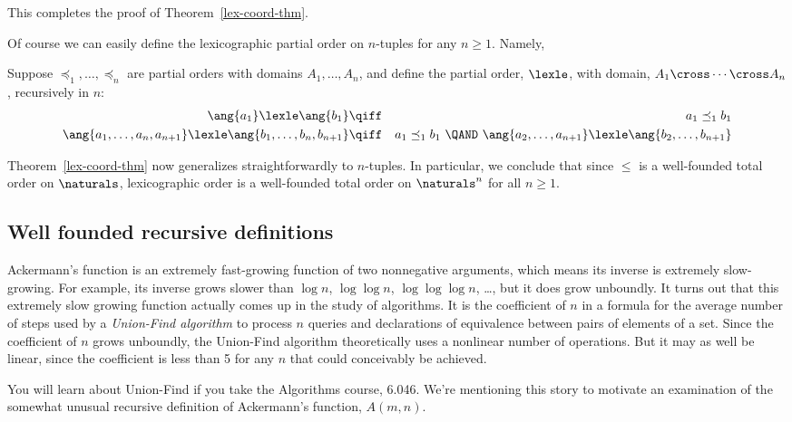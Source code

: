 This completes the proof of Theorem~\ref{lex-coord-thm}.


Of course \iffalse the values of states for the robot in the previous
section were triples not pairs, but\fi
we can easily define the
lexicographic partial order on $n$-tuples for any $n\ge 1$.  Namely,
\begin{definition}\label{lexn}
  Suppose $\preceq_1,\dots, \preceq_n$ are partial orders with domains
  $A_1, \dots, A_n$, and define the partial order, $\lexle$, with domain,
  $A_1 \cross \cdots \cross A_n$, recursively in $n$:
\begin{eqnarray*}
\ang{a_1} \lexle \ang{b_1} &\qiff& a_1 \preceq_1 b_1\\
\ang{a_1,\dots,a_n,a_{n+1}} \lexle \ang{b_1,\dots,b_n,b_{n+1}} &\qiff&
  a_1 \preceq_1 b_1\ \QAND\
    \ang{a_2,\dots,a_{n+1}} \lexle \ang{b_2,\dots,b_{n+1}}
\end{eqnarray*}
\end{definition}
Theorem~\ref{lex-coord-thm} now generalizes straightforwardly to
$n$-tuples.  In particular, we conclude that since $\le$ is a well-founded
total order on $\naturals$, lexicographic order is a well-founded total
order on $\naturals^n$ for all $n \ge 1$.


\subsection{Well founded recursive definitions}

Ackermann's function is an extremely fast-growing function of two
nonnegative arguments, which means its inverse is extremely slow-growing.
For example, its inverse grows slower than $\log n$, $\log \log n$, $\log
\log \log n$, \dots, but it does grow unboundly.  It turns out that this
extremely slow growing function actually comes up in the study of
algorithms.  It is the coefficient of $n$ in a formula for the average
number of steps used by a \emph{Union-Find algorithm} to process $n$
queries and declarations of equivalence between pairs of elements of a
set.  Since the coefficient of $n$ grows unboundly, the Union-Find
algorithm theoretically uses a nonlinear number of operations.  But it may
as well be linear, since the coefficient is less than 5 for any $n$ that
could conceivably be achieved.

You will learn about Union-Find if you take the Algorithms course, 6.046.
We're mentioning this story to motivate an examination of the somewhat
unusual recursive definition of Ackermann's function, $A(m,n)$.

